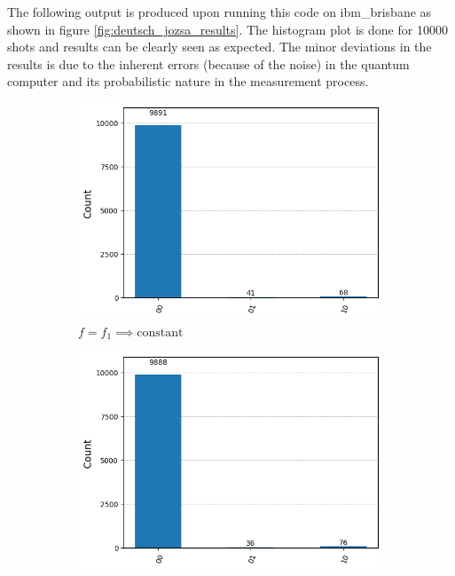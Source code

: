 \documentclass[12pt, oneside]{book}
\theoremstyle{definition}
\theoremstyle{definition}
\theoremstyle{remark}
\begin{document}
\begin{enumerate}
    The following output is produced upon running this code on ibm\_brisbane as shown in figure \ref{fig:deutsch_jozsa_results}. The histogram plot is done for 10000 shots and results can be clearly seen as expected. The minor deviations in the results is due to the inherent errors (because of the noise) in the quantum computer and its probabilistic nature in the measurement process.
    \begin{figure}[H]
        \centering
        \begin{subfigure}[b]{0.45\linewidth}
        \centering
        \includegraphics[width=1\linewidth]{../images/deutsch_jozsa_const_0results.png}
        \caption{$f=f_1 \implies \text{constant}$}
        \label{fig:deutsch_jozsa_result_f1}
        \end{subfigure}
        \hfill
        \centering
        \begin{subfigure}[b]{0.45\linewidth}
        \centering
        \includegraphics[width=1\linewidth]{../images/deutsch_jozsa_const_1results.png}

\end{subfigure}
\end{figure}
\end{enumerate}
\end{document}
